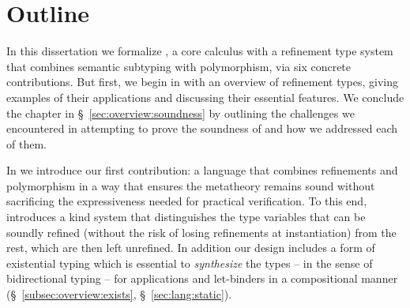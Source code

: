 \section{Outline}
\label{sec:outline}

In this dissertation we formalize \sysrf, a core calculus
with a refinement type system that combines semantic
subtyping with polymorphism, via six concrete contributions.
%
But first, we begin in  with an overview 
of refinement types, giving examples of their applications
and discussing their essential features. 
%
We conclude the
chapter in \S~\ref{sec:overview:soundness}          %
by outlining the challenges we encountered in attempting to
prove the soundness of \sysrf and how we addressed each of them.

%
In  we introduce            %
our first contribution: a language
that combines refinements and polymorphism
in a way that ensures the metatheory remains sound
without sacrificing the expressiveness needed
for practical verification.
%
To this end, \sysrf introduces a kind
system that distinguishes the type
variables that can be soundly refined
(without the risk of losing refinements
at instantiation) from the rest,
which are then left unrefined.
%
In addition our design includes
a form of existential typing \cite{Knowles09}
which is essential to \emph{synthesize} the types
-- in the sense of bidirectional typing -- for applications
and let-binders in a compositional manner 
(\S~\ref{subsec:overview:exists}, \S~\ref{sec:lang:static}).             %

